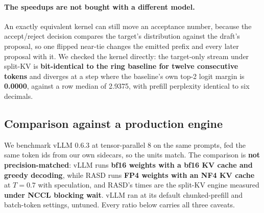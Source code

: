 \documentclass{article}
\begin{document}
\paragraph{The speedups are not bought with a different model.} An exactly equivalent kernel
can still move an acceptance number, because the accept/reject decision compares the target's
distribution against the draft's proposal, so one flipped near-tie changes the emitted prefix
and every later proposal with it. We checked the kernel directly: the target-only stream under
split-KV is \textbf{bit-identical to the ring baseline for twelve consecutive tokens} and
diverges at a step where the baseline's own top-2 logit margin is \textbf{0.0000}, against a
row median of 2.9375, with prefill perplexity identical to six decimals.

\subsection{Comparison against a production engine}
\label{sec:res-vllm}

We benchmark vLLM 0.6.3 at tensor-parallel 8 on the same prompts, fed the same token ids from
our own sidecars, so the units match. The comparison is \textbf{not precision-matched}: vLLM
runs \textbf{bf16 weights with a bf16 KV cache and greedy decoding}, while RASD runs
\textbf{FP4 weights with an NF4 KV cache} at $T{=}0.7$ with speculation, and RASD's times are
the split-KV engine measured \textbf{under NCCL blocking wait}. vLLM ran at its default
chunked-prefill and batch-token settings, untuned. Every ratio below carries all three
caveats.

\begin{table}[t]
\centering
\caption{vLLM (bf16, bf16 KV, greedy, default kernel settings) against the split-KV ring engine
(FP4 weights, NF4 KV, $T{=}0.7$ sampled, NCCL blocking wait) on the same prompts. Prefill is
the first-token time; the two ratio columns are vLLM's prefill and vLLM's \emph{entire run}
(prefill plus 128 decode steps) each divided by RASD's prefill; decode is per token.
\textbf{Not a precision-matched comparison}.}
\label{tab:vllm}

\end{table}
\end{document}
